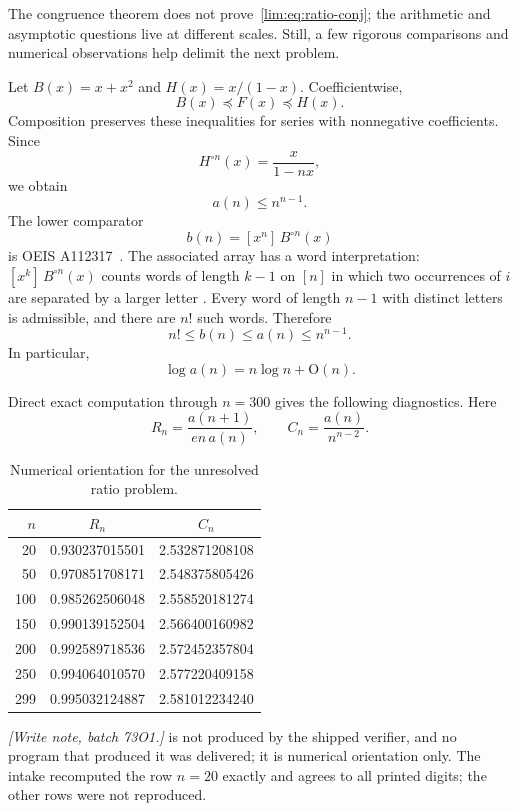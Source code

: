 \documentclass[11pt]{article}
\theoremstyle{definition}
\theoremstyle{remark}
\newcommand{\coef}[2]{[x^{#1}]\,#2}
\newcommand{\Oh}{\mathrm O}
\begin{document}
The congruence theorem does not prove~\eqref{lim:eq:ratio-conj}; the arithmetic
and asymptotic questions live at different scales.  Still, a few rigorous
comparisons and numerical observations help delimit the next problem.

Let $B(x)=x+x^2$ and $H(x)=x/(1-x)$.  Coefficientwise,
\[
  B(x)\preceq F(x)\preceq H(x).
\]
Composition preserves these inequalities for series with nonnegative
coefficients.  Since
\[
  H^{\circ n}(x)=\frac{x}{1-nx},
\]
we obtain
\begin{equation}\label{lim:eq:upper-bound}
  a(n)\le n^{n-1}.
\end{equation}
The lower comparator
\[
  b(n)=\coef{n}{B^{\circ n}(x)}
\]
is OEIS A112317~\cite{OEIS-A112317}.  The associated array has a word
interpretation: $\coef{k}{B^{\circ n}(x)}$ counts words of length $k-1$ on
$[n]$ in which two occurrences of $i$ are separated by a larger letter
\cite{OEIS-A122888}.  Every word of length $n-1$ with distinct letters is
admissible, and there are $n!$ such words.  Therefore
\begin{equation}\label{lim:eq:basic-growth-bounds}
  n!\le b(n)\le a(n)\le n^{n-1}.
\end{equation}
In particular,
\[
  \log a(n)=n\log n+\Oh(n).
\]

Direct exact computation through $n=300$ gives the following diagnostics.
Here
\[
  R_n=\frac{a(n+1)}{en\,a(n)},
  \qquad
  C_n=\frac{a(n)}{n^{n-2}}.
\]
\begin{table}[ht]
\centering
\caption{Numerical orientation for the unresolved ratio problem.}
\label{lim:tab:ratio-data}
\begin{tabular}{rcc}
\toprule
$n$ & $R_n$ & $C_n$\\
\midrule
20  &0.930237015501&2.532871208108\\
50  &0.970851708171&2.548375805426\\
100 &0.985262506048&2.558520181274\\
150 &0.990139152504&2.566400160982\\
200 &0.992589718536&2.572452357804\\
250 &0.994064010570&2.577220409158\\
299 &0.995032124887&2.581012234240\\
\bottomrule
\end{tabular}
\end{table}
\emph{[Write note, batch 73O1.]}  is not
produced by the shipped verifier, and no program that produced it was
delivered; it is numerical orientation only. The intake recomputed the row
$n=20$ exactly and agrees to all printed digits; the other rows were not
reproduced.
\end{document}
